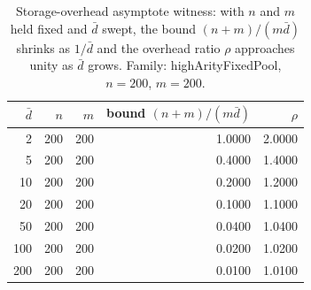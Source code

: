 \begin{table}[t]
\centering
\caption{Storage-overhead asymptote witness: with $n$ and $m$ held fixed and $\bar{d}$ swept, the bound $(n+m)/(m\bar{d})$ shrinks as $1/\bar{d}$ and the overhead ratio $\rho$ approaches unity as $\bar{d}$ grows. Family: \textsf{highArityFixedPool}, $n=200$, $m=200$.}
\label{tab:storage_asymptote}
\begin{tabular}{rrrrr}
\toprule
$\bar{d}$ & $n$ & $m$ & bound $(n+m)/(m\bar{d})$ & $\rho$ \\
\midrule
  2 & 200 & 200 & 1.0000 & 2.0000 \\
  5 & 200 & 200 & 0.4000 & 1.4000 \\
 10 & 200 & 200 & 0.2000 & 1.2000 \\
 20 & 200 & 200 & 0.1000 & 1.1000 \\
 50 & 200 & 200 & 0.0400 & 1.0400 \\
100 & 200 & 200 & 0.0200 & 1.0200 \\
200 & 200 & 200 & 0.0100 & 1.0100 \\
\bottomrule
\end{tabular}
\end{table}